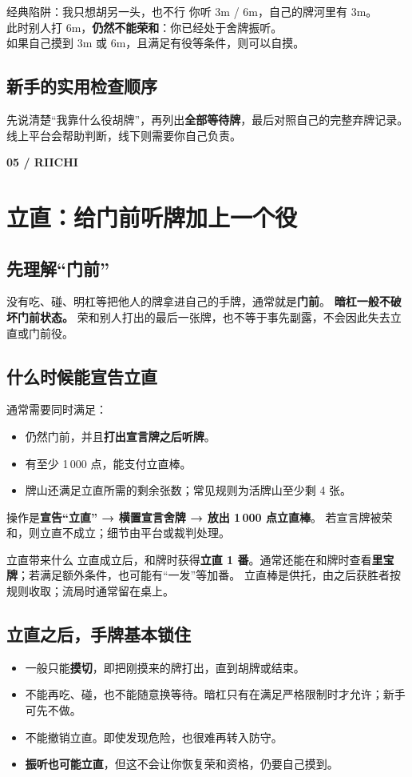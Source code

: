 \documentclass[UTF8,a4paper,zihao=5,fontset=fandol]{ctexart}
\newcommand{\pageintro}[3]{\clearpage\phantomsection\label{#1}
 {\small\sffamily\bfseries\color{gold}#2}\par\vspace{2pt}\section{#3}}
\newcommand{\key}[1]{\textbf{\color{teal}#1}}
\newcommand{\notation}[1]{{\ttfamily\color{teal}#1}}
\begin{document}
\begin{example}{经典陷阱：我只想胡另一头，也不行}
你听 \notation{3m / 6m}，自己的牌河里有 \notation{3m}。\\
此时别人打 \notation{6m}，\textbf{仍然不能荣和}：你已经处于舍牌振听。\\
如果自己摸到 \notation{3m} 或 \notation{6m}，且满足有役等条件，则可以自摸。
\end{example}
\subsection{新手的实用检查顺序}
先说清楚“我靠什么役胡牌”，再列出\textbf{全部等待牌}，最后对照自己的完整弃牌记录。
线上平台会帮助判断，线下则需要你自己负责。

\pageintro{riichi}{05 / RIICHI}{立直：给门前听牌加上一个役}
\subsection{先理解“门前”}
没有吃、碰、明杠等把他人的牌拿进自己的手牌，通常就是\key{门前}。
\textbf{暗杠一般不破坏门前状态。} 荣和别人打出的最后一张牌，也不等于事先副露，不会因此失去立直或门前役。

\subsection{什么时候能宣告立直}
通常需要同时满足：
\begin{itemize}
\item 仍然门前，并且\textbf{打出宣言牌之后听牌}。
\item 有至少 1\,000 点，能支付立直棒。
\item 牌山还满足立直所需的剩余张数；常见规则为活牌山至少剩 4 张。
\end{itemize}
操作是\textbf{宣告“立直” → 横置宣言舍牌 → 放出 1\,000 点立直棒}。
若宣言牌被荣和，则立直不成立；细节由平台或裁判处理。

\begin{note}{立直带来什么}
立直成立后，和牌时获得\textbf{立直 1 番}。通常还能在和牌时查看\textbf{里宝牌}；若满足额外条件，也可能有“一发”等加番。
立直棒是供托，由之后获胜者按规则收取；流局时通常留在桌上。
\end{note}

\subsection{立直之后，手牌基本锁住}
\begin{itemize}
\item 一般只能\textbf{摸切}，即把刚摸来的牌打出，直到胡牌或结束。
\item 不能再吃、碰，也不能随意换等待。暗杠只有在满足严格限制时才允许；新手可先不做。
\item 不能撤销立直。即使发现危险，也很难再转入防守。
\item \textbf{振听也可能立直}，但这不会让你恢复荣和资格，仍要自己摸到。
\end{itemize}
\end{document}
